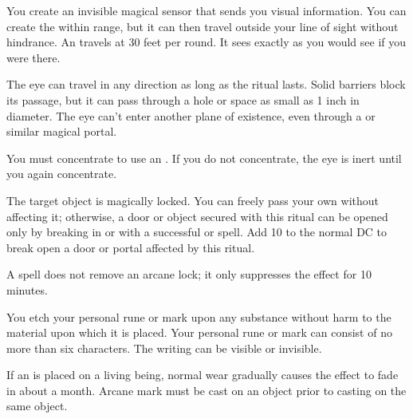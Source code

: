 \begin{spelleffect}
You create an invisible magical sensor that sends you visual information. You can create the  within \rngmed range, but it can then travel outside your line of sight without hindrance. An  travels at 30 feet per round. It sees exactly as you would see if you were there.
\par The eye can travel in any direction as long as the ritual lasts. Solid barriers block its passage, but it can pass through a hole or space as small as 1 inch in diameter. The eye can't enter another plane of existence, even through a  or similar magical portal.
\par You must concentrate to use an . If you do not concentrate, the eye is inert until you again concentrate.
\end{spelleffect}

\begin{spelleffect}
The target object is magically locked. You can freely pass your own  without affecting it; otherwise, a door or object secured with this ritual can be opened only by breaking in or with a successful  or  spell. Add 10 to the normal DC to break open a door or portal affected by this ritual.
\end{spelleffect}
\begin{spellnotes}
A  spell does not remove an arcane lock; it only suppresses the effect for 10 minutes.
\end{spellnotes}

\spellrng{\rngtouch}
\begin{spelleffect}
You etch your personal rune or mark upon any substance without harm to the material upon which it is placed. Your personal rune or mark can consist of no more than six characters. The writing can be visible or invisible.
\end{spelleffect}
\begin{spellnotes}
If an  is placed on a living being, normal wear gradually causes the effect to fade in about a month. Arcane mark must be cast on an object prior to casting  on the same object.
\end{spellnotes}

